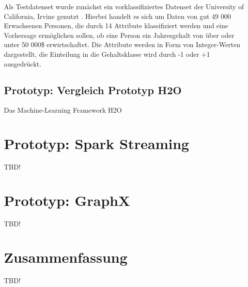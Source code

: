 Als Testdatenset wurde zunächst ein vorklassifiziertes Datenset der University of California, Irvine genutzt . Hierbei handelt es sich um Daten von gut 49 000 Erwachsenen Personen, die durch 14 Attribute klassifiziert werden und eine Vorhersage ermöglichen sollen, ob eine Person ein Jahresgehalt von über oder unter 50 000\$ erwirtschaftet. Die Attribute werden in Form von Integer-Werten dargestellt, die Einteilung in die Gehaltsklasse wird durch -1 oder +1 ausgedrückt.






\subsection{Prototyp: Vergleich Prototyp H2O }
\label{section:vergleich h2o}

Das Machine-Learning Framework H2O  


\section{Prototyp: Spark Streaming }
\label{section:prototyp spark streaming}

TBD!



\section{Prototyp: GraphX}
\label{section:prototyp graphX}

TBD!




\section{Zusammenfassung}
\label{section:zusammen}



TBD!


